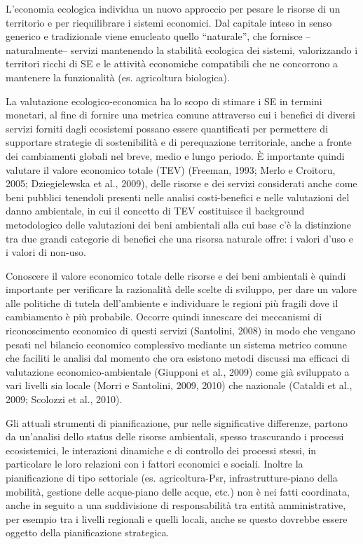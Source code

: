 \documentclass[12pt,a4paper]{article}
\begin{document}
	L'economia ecologica individua un nuovo approccio per pesare le risorse di un territorio e per riequilibrare i sistemi economici. Dal capitale inteso in senso generico e tradizionale viene enucleato quello ``naturale'', che fornisce --naturalmente-- servizi mantenendo la stabilità ecologica dei sistemi, valorizzando i territori ricchi di SE e le attività economiche compatibili che ne concorrono a mantenere la funzionalità (es. agricoltura biologica). 
	
	La valutazione ecologico-economica ha lo scopo di stimare i SE in termini monetari, al fine di fornire una metrica comune
	attraverso cui i benefici di diversi servizi forniti dagli ecosistemi possano essere quantificati \cite{MEA_EcosystemsAndHumanWellBeing:Synthesis} per permettere di supportare strategie di sostenibilità e di perequazione territoriale, anche a fronte dei cambiamenti globali nel breve, medio e lungo periodo. È importante quindi valutare il valore economico totale (TEV) (Freeman, 1993; Merlo e Croitoru, 2005; Dziegielewska et al., 2009), delle risorse e dei servizi considerati anche come beni pubblici tenendoli presenti nelle analisi costi-benefici e nelle valutazioni del danno ambientale, in cui il concetto di TEV costituisce il background metodologico delle valutazioni dei beni ambientali alla cui base c'è la distinzione tra due grandi categorie di benefici che una risorsa naturale offre: i valori d'uso e i valori di non-uso.  
	
	Conoscere il valore economico totale delle risorse e dei beni ambientali è quindi importante per verificare la razionalità delle scelte di sviluppo, per dare un valore alle politiche di tutela dell'ambiente e individuare le regioni più fragili dove il cambiamento è più probabile. Occorre quindi innescare dei meccanismi di riconoscimento economico di questi servizi (Santolini, 2008) in modo che vengano pesati nel bilancio economico complessivo mediante un sistema metrico comune che  faciliti le analisi dal momento che ora esistono metodi discussi ma efficaci di valutazione economico-ambientale (Giupponi et al., 2009) come già sviluppato a vari livelli sia locale (Morri e Santolini, 2009, 2010) che nazionale (Cataldi et al., 2009; Scolozzi et al., 2010). 
	
	Gli attuali strumenti di pianificazione, pur nelle significative differenze, partono da un'analisi dello status delle risorse ambientali, spesso trascurando i processi ecosistemici, le interazioni dinamiche e di controllo dei processi stessi, in particolare le loro relazioni con i fattori economici e sociali. Inoltre la pianificazione di tipo settoriale (es. agricoltura-Psr, infrastrutture-piano della mobilità, gestione delle acque-piano delle acque, etc.) non è nei fatti coordinata, anche in seguito a una suddivisione di responsabilità tra entità amministrative, per esempio tra i livelli regionali e quelli 	locali, anche se questo dovrebbe essere oggetto della pianificazione strategica. 
	
\end{document}
